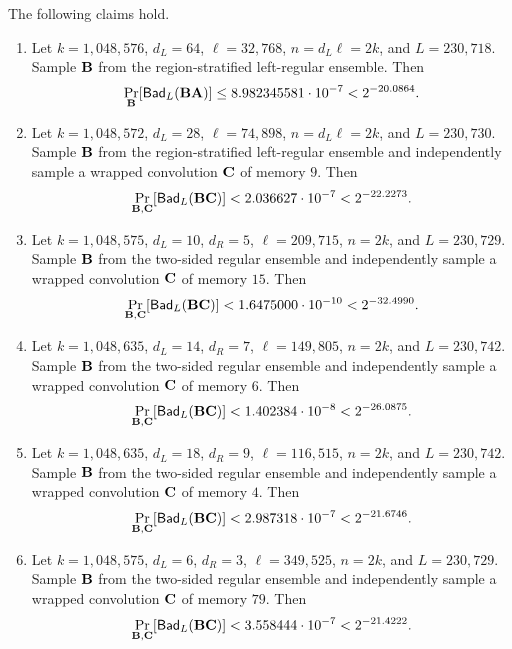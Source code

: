 \begin{theorem}
\label{thm:regular-binary-certificates}
The following claims hold.
\begin{enumerate}
  \item Let $k=1{,}048{,}576$, $d_L=64$, $\ell=32{,}768$,
  $n=d_L\ell=2k$, and $L=230{,}718$.  Sample $\mathbf B$ from the
  region-stratified left-regular ensemble.  Then
  \begin{equation}
   \Pr_{\mathbf B}[\mathsf{Bad}_L(\mathbf B\mathbf A)]
   \leq8.982345581\cdot10^{-7}<2^{-20.0864}.
   \label{eq:regular-ea-certificate}
  \end{equation}
  \item Let $k=1{,}048{,}572$, $d_L=28$, $\ell=74{,}898$,
  $n=d_L\ell=2k$, and $L=230{,}730$.  Sample $\mathbf B$ from the
  region-stratified left-regular ensemble and independently sample a wrapped
  convolution $\mathbf C$ of memory $9$.  Then
  \begin{equation}
   \Pr_{\mathbf B,\mathbf C}[\mathsf{Bad}_L(\mathbf B\mathbf C)]
   <2.036627\cdot10^{-7}<2^{-22.2273}.
   \label{eq:regular-ec-certificate}
  \end{equation}
  \item Let $k=1{,}048{,}575$, $d_L=10$, $d_R=5$,
  $\ell=209{,}715$, $n=2k$, and $L=230{,}729$.  Sample $\mathbf B$ from the
  two-sided regular ensemble and independently sample a wrapped convolution
  $\mathbf C$ of memory $15$.  Then
  \begin{equation}
   \Pr_{\mathbf B,\mathbf C}[\mathsf{Bad}_L(\mathbf B\mathbf C)]
   <1.6475000\cdot10^{-10}<2^{-32.4990}.
   \label{eq:biregular-binary-ec-certificate}
  \end{equation}
  \item Let $k=1{,}048{,}635$, $d_L=14$, $d_R=7$,
  $\ell=149{,}805$, $n=2k$, and $L=230{,}742$.  Sample $\mathbf B$ from the
  two-sided regular ensemble and independently sample a wrapped convolution
  $\mathbf C$ of memory $6$.  Then
  \begin{equation}
   \Pr_{\mathbf B,\mathbf C}[\mathsf{Bad}_L(\mathbf B\mathbf C)]
   <1.402384\cdot10^{-8}<2^{-26.0875}.
   \label{eq:biregular-binary-ec-degree-fourteen-certificate}
  \end{equation}
  \item Let $k=1{,}048{,}635$, $d_L=18$, $d_R=9$,
  $\ell=116{,}515$, $n=2k$, and $L=230{,}742$.  Sample $\mathbf B$ from the
  two-sided regular ensemble and independently sample a wrapped convolution
  $\mathbf C$ of memory $4$.  Then
  \begin{equation}
   \Pr_{\mathbf B,\mathbf C}[\mathsf{Bad}_L(\mathbf B\mathbf C)]
   <2.987318\cdot10^{-7}<2^{-21.6746}.
   \label{eq:biregular-binary-ec-degree-eighteen-certificate}
  \end{equation}
  \item Let $k=1{,}048{,}575$, $d_L=6$, $d_R=3$,
  $\ell=349{,}525$, $n=2k$, and $L=230{,}729$.  Sample $\mathbf B$ from the
  two-sided regular ensemble and independently sample a wrapped convolution
  $\mathbf C$ of memory $79$.  Then
  \begin{equation}
   \Pr_{\mathbf B,\mathbf C}[\mathsf{Bad}_L(\mathbf B\mathbf C)]
   <3.558444\cdot10^{-7}<2^{-21.4222}.
   \label{eq:biregular-binary-ec-degree-six-certificate}
  \end{equation}
\end{enumerate}
\end{theorem}


